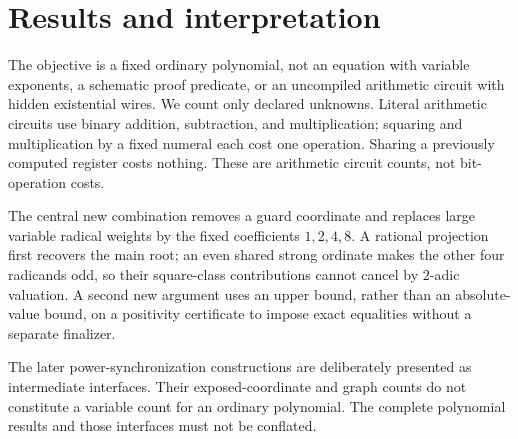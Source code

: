 \section{Results and interpretation}
The objective is a fixed ordinary polynomial, not an equation with variable
exponents, a schematic proof predicate, or an uncompiled arithmetic circuit
with hidden existential wires. We count only declared unknowns. Literal
arithmetic circuits use binary addition, subtraction, and multiplication;
squaring and multiplication by a fixed numeral each cost one operation.
Sharing a previously computed register costs nothing. These are arithmetic
circuit counts, not bit-operation costs.

The central new combination removes a guard coordinate and replaces large
variable radical weights by the fixed coefficients $1,2,4,8$. A rational
projection first recovers the main root; an even shared strong ordinate
makes the other four radicands odd, so their square-class contributions
cannot cancel by $2$-adic valuation. A second new argument uses an upper
bound, rather than an absolute-value bound, on a positivity certificate to
impose exact equalities without a separate finalizer.

The later power-synchronization constructions are deliberately presented as
intermediate interfaces. Their exposed-coordinate and graph counts do not
constitute a variable count for an ordinary polynomial. The complete
polynomial results and those interfaces must not be conflated.

